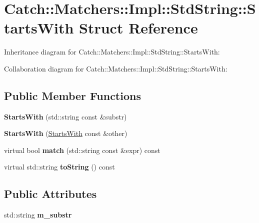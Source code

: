 \hypertarget{struct_catch_1_1_matchers_1_1_impl_1_1_std_string_1_1_starts_with}{}\section{Catch\+:\+:Matchers\+:\+:Impl\+:\+:Std\+String\+:\+:Starts\+With Struct Reference}
\label{struct_catch_1_1_matchers_1_1_impl_1_1_std_string_1_1_starts_with}


Inheritance diagram for Catch\+:\+:Matchers\+:\+:Impl\+:\+:Std\+String\+:\+:Starts\+With\+:


Collaboration diagram for Catch\+:\+:Matchers\+:\+:Impl\+:\+:Std\+String\+:\+:Starts\+With\+:
\subsection*{Public Member Functions}
\begin{DoxyCompactItemize}
\item 
\mbox{\label{struct_catch_1_1_matchers_1_1_impl_1_1_std_string_1_1_starts_with_a1940dacb184d129adb33acea73dedc17}} 
{\bfseries Starts\+With} (std\+::string const \&substr)
\item 
\mbox{\label{struct_catch_1_1_matchers_1_1_impl_1_1_std_string_1_1_starts_with_a5526cb587632e7e46253d6f60ae01098}} 
{\bfseries Starts\+With} (\hyperlink{struct_catch_1_1_matchers_1_1_impl_1_1_std_string_1_1_starts_with}{Starts\+With} const \&other)
\item 
\mbox{\label{struct_catch_1_1_matchers_1_1_impl_1_1_std_string_1_1_starts_with_ab8f8d15e06d7ec13fee7d9ec4075dafa}} 
virtual bool {\bfseries match} (std\+::string const \&expr) const
\item 
\mbox{\label{struct_catch_1_1_matchers_1_1_impl_1_1_std_string_1_1_starts_with_a85a24e2ac23025edbe31cbf5bb755fb3}} 
virtual std\+::string {\bfseries to\+String} () const
\end{DoxyCompactItemize}
\subsection*{Public Attributes}
\begin{DoxyCompactItemize}
\item 
\mbox{\label{struct_catch_1_1_matchers_1_1_impl_1_1_std_string_1_1_starts_with_aebcdf35b98fd0097d9e9113b9219fcd1}} 
std\+::string {\bfseries m\+\_\+substr}
\end{DoxyCompactItemize}

